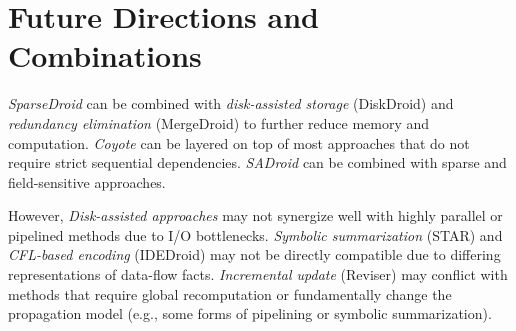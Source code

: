 \section*{Future Directions and Combinations}

\emph{SparseDroid} can be combined with \emph{disk-assisted storage} (DiskDroid) and \emph{redundancy elimination} (MergeDroid) to further reduce memory and computation.
\emph{Coyote} can be layered on top of most approaches that do not require strict sequential dependencies.
\emph{SADroid} can be combined with sparse and field-sensitive approaches.

However, \emph{Disk-assisted approaches} may not synergize well with highly parallel or pipelined methods due to I/O bottlenecks.
\emph{Symbolic summarization} (STAR) and \emph{CFL-based encoding} (IDEDroid) may not be directly compatible due to differing representations of data-flow facts.
\emph{Incremental update} (Reviser) may conflict with methods that require global recomputation or fundamentally change the propagation model (e.g., some forms of pipelining or symbolic summarization).

